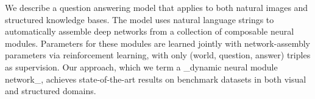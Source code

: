 We describe a question answering model that applies to both natural images and structured knowledge bases. The model uses natural language strings to automatically assemble deep networks from a collection of composable neural modules. Parameters for these modules are learned jointly with network-assembly parameters via reinforcement learning, with only (world, question, answer) triples as supervision. Our  approach, which we term a \_dynamic neural module network\_,  achieves state-of-the-art results on benchmark datasets in both visual and structured domains.
